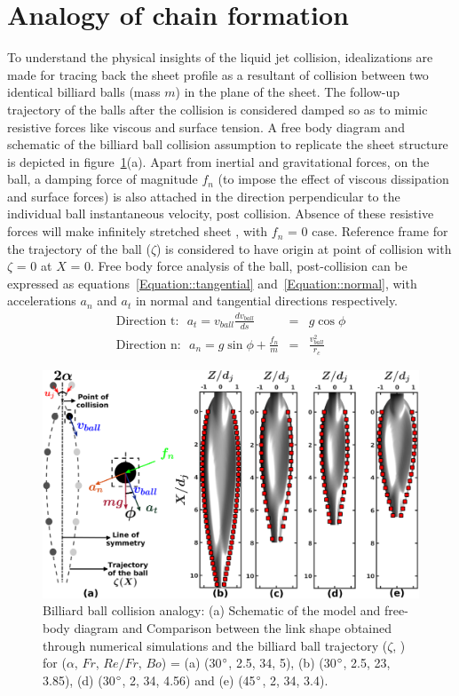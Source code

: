 \documentclass{jfm}
\begin{document}
\section{Analogy of chain formation}	
To understand the physical insights of the liquid jet collision, idealizations are made for tracing back the sheet profile as a resultant of collision between two identical billiard balls (mass $m$) in the plane of the sheet. The follow-up trajectory of the balls after the collision is considered damped so as to mimic resistive forces like viscous and surface tension. A free body diagram and schematic of the billiard ball collision assumption to replicate the sheet structure is depicted in figure~\ref{Figure::analytical}(a). Apart from inertial and gravitational forces, on the ball, a damping force of magnitude $f_n$ (to impose the effect of viscous dissipation and surface forces) is also attached in the direction perpendicular to the individual ball instantaneous velocity, post collision. Absence of these resistive forces will make infinitely stretched sheet \citep{taylor1960formation}, with $f_n$ = 0 case. Reference frame for the trajectory of the ball ($\zeta$) is considered to have origin at point of collision with $\zeta$ = 0 at $X$ = 0. Free body force analysis of the ball, post-collision can be expressed as equations~\ref{Equation::tangential} and~\ref{Equation::normal}, with accelerations $a_n$ and $a_t$ in normal and tangential directions respectively.
\begin{subequations}%
	\label{Equation::forceBal}	
	\begin{eqnarray}
	\label{Equation::tangential}
	\text{Direction t:}\:\:\: a_t = v_{ball}\frac{dv_{ball}}{ds} &=& g\cos\phi\\
	\label{Equation::normal}
	\text{Direction n:}\:\:\: a_n = g\sin\phi + \frac{f_n}{m} &=& \frac{v_{ball}^2}{r_c}
	\end{eqnarray}
\end{subequations}
\begin{figure}%
	\centering
	\includegraphics[width=0.75\linewidth]{Figure7}
	\caption{Billiard ball collision analogy: (a) Schematic of the model and free-body diagram and Comparison between the link shape obtained through numerical simulations and the billiard ball trajectory ($\zeta$, \protect\MarkerSquareRed) for ($\alpha$, $Fr$, $Re/Fr$, $Bo$) = (a) (30$\degree$, 2.5, 34, 5), (b) (30$\degree$, 2.5, 23, 3.85), (d) (30$\degree$, 2, 34, 4.56) and (e) (45$\degree$, 2, 34, 3.4).}
	\label{Figure::analytical}
\end{figure}%
\end{document}
